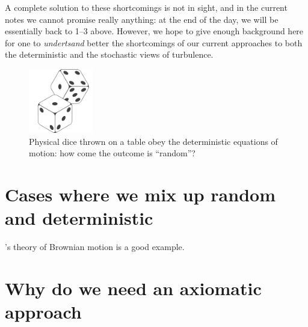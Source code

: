 \documentclass[12pt]{article}
\begin{document}
A complete solution to these shortcomings is not in sight, and in the current
notes we cannot promise really anything: at the end of the day, we will be
essentially back to 1--3 above.  However, we hope to give enough background
here for one to \emph{undertsand} better the shortcomings of our current
approaches to both the deterministic and the stochastic views of turbulence.




\begin{figure}\centering
\includegraphics[width=0.25\textwidth]{dice}
\caption{Physical dice thrown on a table obey the deterministic equations of
  motion: how come the outcome is ``random''?\label{fig:dice}}
\end{figure}

\section{Cases where we mix up random and deterministic}

\cite{einstein--uber.molekularkinetischen}'s theory of Brownian motion is a good
example. 

\section{Why do we need an axiomatic approach}
\end{document}
